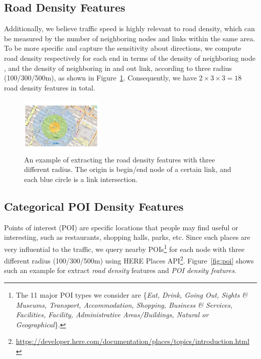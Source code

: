 \subsection{Road Density Features}
Additionally, we believe traffic speed is highly relevant to road density, which can be measured by the number of neighboring nodes and links within the same area.
To be more specific and capture the sensitivity about directions, we compute road density respectively for each end in terms of the density of neighboring node , and the density of neighboring in and out link,  according to three radius (100/300/500m), as shown in Figure~\ref{fig:road_density}.
Consequently, we have $2 \times 3 \times 3 = 18$ road density features in total.
%
\begin{figure}[t]
	\centering
	\includegraphics[width=0.35\textwidth]{figures/roaddensity.pdf}
	\caption{An example of extracting the road density features with three different radius. The origin is begin/end node of a certain link, and each blue circle is a link intersection.}
	\label{fig:road_density}
\end{figure}


\subsection{Categorical POI Density Features}
Points of interest (POI) are specific locations that people may find useful or interesting, such as restaurants, shopping halls, parks, etc.
Since such places are very influential to the traffic, we query nearby POIs\footnote{The 11 major POI types we consider are \{\textit{Eat, Drink, Going Out, Sights \& Museums, Transport, Accommodation, Shopping, Business \& Services, Facilities, Facility, Administrative Areas/Buildings, Natural or Geographical}\}. } 
 for each node with three different radius (100/300/500m) using HERE Places API\footnote{\url{https://developer.here.com/documentation/places/topics/introduction.html
}}. 
Figure~\ref{fig:poi} shows such an example for extract \textit{road density} features and\textit{ POI density features}. 

